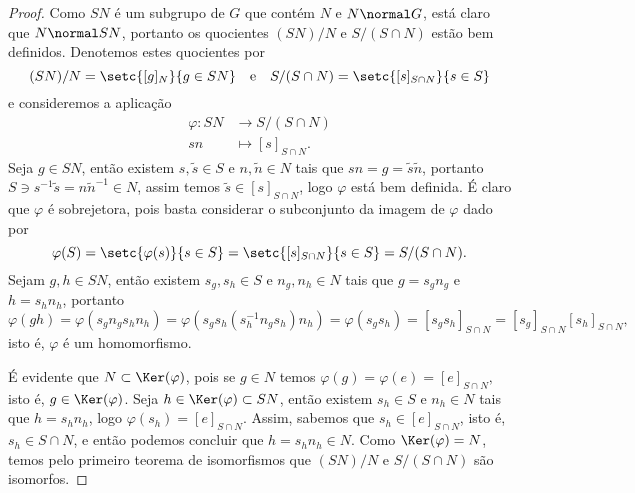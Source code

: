 \begin{proof}
    Como \(SN\) é um subgrupo de \(G\) que contém \(N\) e \(N \normal G\), está claro que \(N \normal SN\), portanto os quocientes \((SN)/N\) e \(S/(S \cap N)\) estão bem definidos. Denotemos estes quocientes por
    \begin{equation*}
        (SN)/N = \setc{[g]_N}{g \in SN}\quad\text{e}\quad S/(S \cap N) = \setc{[s]_{S\cap N}}{s \in S}
    \end{equation*}
    e consideremos a aplicação
    \begin{align*}
        \varphi : SN &\to S/(S \cap N)\\
                  sn &\mapsto [s]_{S \cap N}.
    \end{align*}
    Seja \(g \in SN\), então existem \(s, \tilde{s} \in S\) e \(n, \tilde{n} \in N\) tais que \(sn = g = \tilde{s} \tilde{n}\), portanto \(S \ni s^{-1}\tilde{s} = n\tilde{n}^{-1} \in N\), assim temos \(\tilde{s} \in [s]_{S \cap N}\), logo \(\varphi\) está bem definida. É claro que \(\varphi\) é sobrejetora, pois basta considerar o subconjunto da imagem de \(\varphi\) dado por
    \begin{equation*}
        \varphi(S) = \setc{\varphi(s)}{s \in S} = \setc{[s]_{S \cap N}}{s \in S} = S / (S \cap N).
    \end{equation*}
    Sejam \(g, h \in SN\), então existem \(s_g, s_h \in S\) e \(n_g, n_h \in N\) tais que \(g = s_g n_g\) e \(h = s_h n_h\), portanto
    \begin{equation*}
        \varphi(gh) = \varphi(s_g n_g s_h n_h) = \varphi\left(s_g s_h (s_h^{-1}n_g s_h)n_h\right) = \varphi(s_g s_h) = [s_gs_h]_{S\cap N} = [s_g]_{S \cap N} [s_h]_{S\cap N},
    \end{equation*}
    isto é, \(\varphi\) é um homomorfismo.

    É evidente que \(N \subset \Ker(\varphi)\), pois se \(g \in N\) temos \(\varphi(g) = \varphi(e) = [e]_{S\cap N},\) isto é, \(g \in \Ker(\varphi)\). Seja \(h \in \Ker(\varphi) \subset SN\), então existem \(s_h \in S\) e \(n_h \in N\) tais que \(h = s_h n_h\), logo \(\varphi(s_h) = [e]_{S \cap N}\). Assim, sabemos que \(s_h \in [e]_{S \cap N}\), isto é, \(s_h \in S \cap N\), e então podemos concluir que \(h = s_h n_h \in N\). Como \(\Ker(\varphi) = N\), temos pelo primeiro teorema de isomorfismos que \((SN)/N\) e \(S/(S\cap N)\) são isomorfos.
\end{proof}
